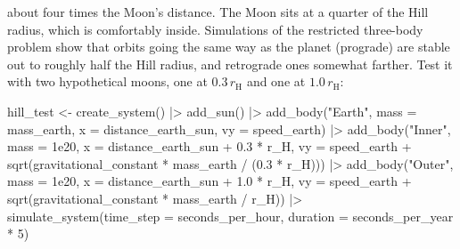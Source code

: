 \documentclass[
  10.5pt,
  letterpaper,
]{scrbook}
\newenvironment{Shaded}{\begin{snugshade}}{\end{snugshade}}
\newcommand{\AttributeTok}[1]{\textcolor[rgb]{0.00,0.00,0.00}{#1}}
\newcommand{\DecValTok}[1]{\textcolor[rgb]{0.00,0.00,0.00}{#1}}
\newcommand{\FloatTok}[1]{\textcolor[rgb]{0.00,0.00,0.00}{#1}}
\newcommand{\FunctionTok}[1]{\textcolor[rgb]{0.00,0.00,0.00}{#1}}
\newcommand{\NormalTok}[1]{\textcolor[rgb]{0.00,0.00,0.00}{#1}}
\newcommand{\OtherTok}[1]{\textcolor[rgb]{0.00,0.00,0.00}{#1}}
\newcommand{\SpecialCharTok}[1]{\textcolor[rgb]{0.00,0.00,0.00}{#1}}
\newcommand{\StringTok}[1]{\textcolor[rgb]{0.00,0.00,0.00}{#1}}
\theoremstyle{definition}
\theoremstyle{plain}
\theoremstyle{remark}
\begin{document}
about four times the Moon's distance. The Moon sits at a quarter of the
Hill radius, which is comfortably inside. Simulations of the restricted
three-body problem show that orbits going the same way as the planet
(prograde) are stable out to roughly half the Hill radius, and
retrograde ones somewhat farther. Test it with two hypothetical moons,
one at \(0.3\,r_{\mathrm{H}}\) and one at \(1.0\,r_{\mathrm{H}}\):

\begin{Shaded}
\begin{Highlighting}[]
\NormalTok{hill\_test }\OtherTok{\textless{}{-}} \FunctionTok{create\_system}\NormalTok{() }\SpecialCharTok{|\textgreater{}}
  \FunctionTok{add\_sun}\NormalTok{() }\SpecialCharTok{|\textgreater{}}
  \FunctionTok{add\_body}\NormalTok{(}\StringTok{"Earth"}\NormalTok{, }\AttributeTok{mass =}\NormalTok{ mass\_earth, }\AttributeTok{x =}\NormalTok{ distance\_earth\_sun, }\AttributeTok{vy =}\NormalTok{ speed\_earth) }\SpecialCharTok{|\textgreater{}}
  \FunctionTok{add\_body}\NormalTok{(}\StringTok{"Inner"}\NormalTok{, }\AttributeTok{mass =} \FloatTok{1e20}\NormalTok{, }\AttributeTok{x =}\NormalTok{ distance\_earth\_sun }\SpecialCharTok{+} \FloatTok{0.3} \SpecialCharTok{*}\NormalTok{ r\_H,}
           \AttributeTok{vy =}\NormalTok{ speed\_earth }\SpecialCharTok{+} \FunctionTok{sqrt}\NormalTok{(gravitational\_constant }\SpecialCharTok{*}\NormalTok{ mass\_earth }\SpecialCharTok{/}\NormalTok{ (}\FloatTok{0.3} \SpecialCharTok{*}\NormalTok{ r\_H))) }\SpecialCharTok{|\textgreater{}}
  \FunctionTok{add\_body}\NormalTok{(}\StringTok{"Outer"}\NormalTok{, }\AttributeTok{mass =} \FloatTok{1e20}\NormalTok{, }\AttributeTok{x =}\NormalTok{ distance\_earth\_sun }\SpecialCharTok{+} \FloatTok{1.0} \SpecialCharTok{*}\NormalTok{ r\_H,}
           \AttributeTok{vy =}\NormalTok{ speed\_earth }\SpecialCharTok{+} \FunctionTok{sqrt}\NormalTok{(gravitational\_constant }\SpecialCharTok{*}\NormalTok{ mass\_earth }\SpecialCharTok{/}\NormalTok{ r\_H)) }\SpecialCharTok{|\textgreater{}}
  \FunctionTok{simulate\_system}\NormalTok{(}\AttributeTok{time\_step =}\NormalTok{ seconds\_per\_hour, }\AttributeTok{duration =}\NormalTok{ seconds\_per\_year }\SpecialCharTok{*} \DecValTok{5}\NormalTok{)}
\end{Highlighting}
\end{Shaded}
\end{document}
